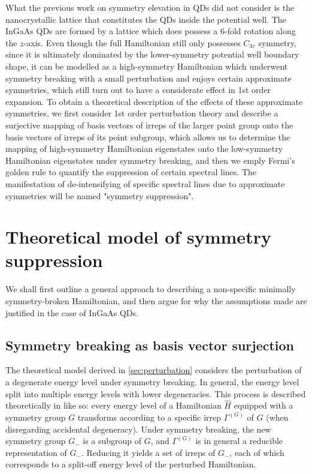 \documentclass[12pt]{article}
\begin{document}
	What the previous work on symmetry elevation in QDs did not consider is the nanocrystallic lattice that constitutes the QDs inside the potential well. The InGaAs QDs are formed by a lattice which does possess a 6-fold rotation along the $z$-axis. Even though the full Hamiltonian still only possesses $C_{3v}$ symmetry, since it is ultimately dominated by the lower-symmetry potential well boundary shape, it can be modelled as a high-symmetry Hamiltonian which underwent symmetry breaking with a small perturbation and enjoys certain approximate symmetries, which still turn out to have a considerate effect in 1st order expansion. To obtain a theoretical description of the effects of these approximate symmetries, we first consider 1st order perturbation theory and describe a surjective mapping of basis vectors of irreps of the larger point group onto the basis vectors of irreps of its point subgroup, which allows us to determine the mapping of high-symmetry Hamiltonian eigenstates onto the low-symmetry Hamiltonian eigenstates under symmetry breaking, and then we emply Fermi's golden rule to quantify the suppression of certain spectral lines. The manifestation of de-intensifying of specific spectral lines due to approximate symmetries will be named "symmetry suppression".
	
	\section{Theoretical model of symmetry suppression}
	We shall first outline a general approach to describing a non-specific minimally symmetry-broken Hamiltonian, and then argue for why the assumptions made are justified in the case of InGaAs QDs. 
	\subsection{Symmetry breaking as basis vector surjection}
	
	The theoretical model derived in \ref{sec:perturbation} considers the perturbation of a degenerate energy level under symmetry breaking. In general, the energy level split into multiple energy levels with lower degeneracies. This process is described theoretically in \cite{dresselhaus} like so: every energy level of a Hamiltonian $\hat{H}$ equipped with a symmetry group $G$ transforms according to a specific irrep $\Gamma^{(G)}$ of $G$ (when disregarding accidental degeneracy). Under symmetry breaking, the new symmetry group $G_-$ is a subgroup of $G$, and $\Gamma^{(G)}$ is in general a reducible representation of $G_-$. Reducing it yields a set of irreps of $G_-$, each of which corresponds to a split-off energy level of the perturbed Hamiltonian.
	
\end{document}
